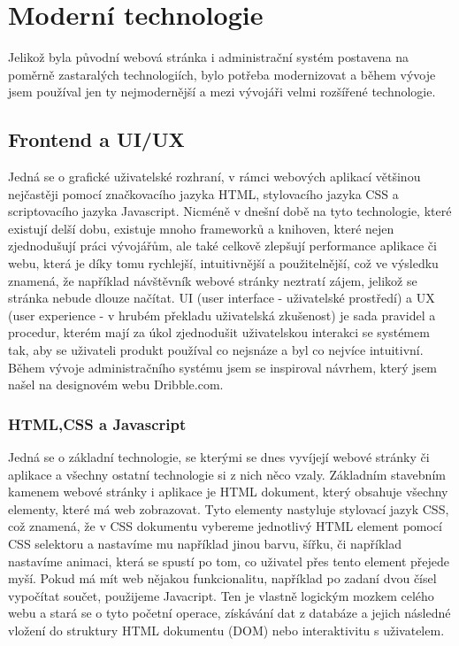 \documentclass[12pt,a4paper]{report}
\begin{document}
  \section{Moderní technologie}
  Jelikož byla původní webová stránka i administrační systém postavena na poměrně zastaralých
  technologiích, bylo potřeba modernizovat a během vývoje jsem používal jen ty nejmodernější a
  mezi vývojáři velmi rozšířené technologie.
  \subsection{Frontend a UI/UX}
  Jedná se o grafické uživatelské rozhraní, v rámci webových aplikací většinou nejčastěji pomocí
  značkovacího jazyka HTML, stylovacího jazyka CSS a scriptovacího jazyka Javascript. Nicméně v
  dnešní době na tyto technologie, které existují delší dobu, existuje mnoho frameworků a knihoven,
  které nejen zjednodušují práci vývojářům, ale také celkově zlepšují performance aplikace či webu,
  která je díky tomu rychlejší, intuitivnější a použitelnější, což ve výsledku znamená, že například
  návštěvník webové stránky neztratí zájem, jelikož se stránka nebude dlouze načítat.
  UI (user interface - uživatelské prostředí) a UX (user experience - v hrubém překladu uživatelská
  zkušenost) je sada pravidel a procedur, kterém mají za úkol zjednodušit uživatelskou interakci se
  systémem tak, aby se uživateli produkt používal co nejsnáze a byl co nejvíce intuitivní. Během
  vývoje administračního systému jsem se inspiroval návrhem, který jsem našel na designovém
  webu Dribble.com.
  \subsubsection{HTML,CSS a Javascript}
  Jedná se o základní technologie, se kterými se dnes vyvíjejí webové stránky či aplikace a všechny
  ostatní technologie si z nich něco vzaly.
  Základním stavebním kamenem webové stránky i aplikace je HTML dokument, který obsahuje
  všechny elementy, které má web zobrazovat.
  Tyto elementy nastyluje stylovací jazyk CSS, což znamená, že v CSS dokumentu vybereme
  jednotlivý HTML element pomocí CSS selektoru a nastavíme mu například jinou barvu, šířku, či
  například nastavíme animaci, která se spustí po tom, co uživatel přes tento element přejede myší.
  Pokud má mít web nějakou funkcionalitu, například po zadaní dvou čísel vypočítat součet,
  použijeme Javacript. Ten je vlastně logickým mozkem celého webu a stará se o tyto početní
  operace, získávání dat z databáze a jejich následné vložení do struktury HTML dokumentu (DOM)
  nebo interaktivitu s uživatelem.
\end{document}
